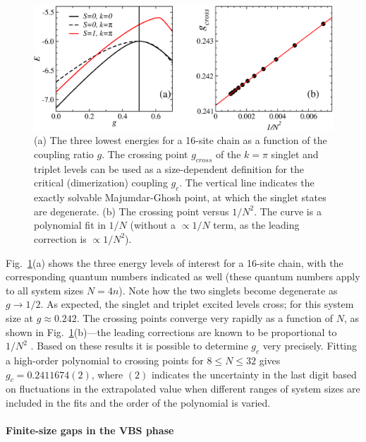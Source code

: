 \documentclass[draft,numberedheadings]{aipproc}
\begin{document}
\begin{figure}
\includegraphics[width=13.25cm, clip]{cross16.eps}
\caption{(a) The three lowest energies for a 16-site chain as a function of the coupling ratio $g$. The crossing point $g_{cross}$ of 
the $k=\pi$ singlet and triplet levels can be used as a size-dependent definition for the critical (dimerization) coupling $g_c$. The vertical 
line indicates the exactly solvable Majumdar-Ghosh point, at which the singlet states are degenerate. (b) The crossing point versus $1/N^2$. 
The curve is a polynomial fit in $1/N$ (without a $\propto 1/N$ term, as the leading correction is $\propto 1/N^2$).}
\label{cross}
\end{figure}

Fig.~\ref{cross}(a) shows the three energy levels of interest for a 16-site chain, with the corresponding quantum numbers indicated
as well (these quantum numbers apply to all system sizes $N=4n$). Note how the two singlets become degenerate as $g \to 1/2$. As expected, the singlet and 
triplet excited levels cross; for this system size at $g\approx 0.242$. The crossing points converge very rapidly as a function of $N$, as shown in 
Fig.~\ref{cross}(b)---the leading corrections are known to be proportional to $1/N^2$ \cite{eggert96b}. Based on these results it is possible to determine 
$g_c$ very precisely. Fitting a high-order polynomial to crossing points for $8 \le N \le 32$ gives $g_c=0.2411674(2)$, where $(2)$ indicates the uncertainty 
in the last digit based on fluctuations in the extrapolated value when different ranges of system sizes are included in the fits and the order of the 
polynomial is varied. 

\paragraph{Finite-size gaps in the VBS phase}
\end{document}
